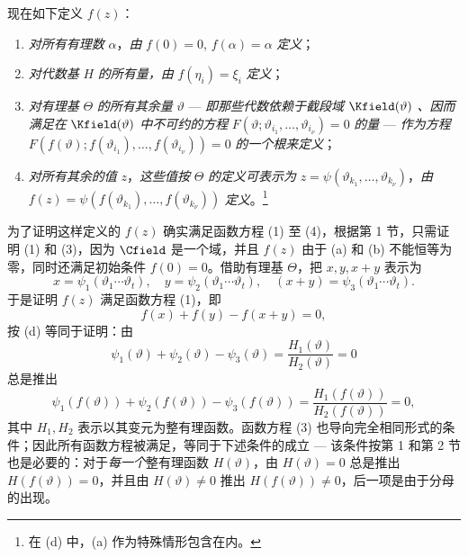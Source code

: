 现在如下定义 $f(z)$：
\begin{enumerate}
\item[(a)] \emph{对所有有理数} $\alpha$，\emph{由} $f(0)=0$, $f(\alpha)=\alpha$ \emph{定义}；
\item[(b)] \emph{对代数基} $H$ \emph{的所有量，由} $f(\eta_i)=\xi_i$ \emph{定义}；
\item[(c)] \emph{对有理基} $\Theta$ \emph{的所有其余量} $\vartheta$ --- \emph{即那些代数依赖于截段域} $\Kfield(\vartheta)$ \emph{、因而满足在} $\Kfield(\vartheta)$ \emph{中不可约的方程} $F(\vartheta;\vartheta_{i_1},\ldots,\vartheta_{i_\nu})=0$ \emph{的量} --- \emph{作为方程} $F(f(\vartheta);f(\vartheta_{i_1}),\ldots,f(\vartheta_{i_\nu}))=0$ \emph{的一个根来定义}；
\item[(d)] \emph{对所有其余的值} $z$，\emph{这些值按} $\Theta$ \emph{的定义可表示为} $z=\psi(\vartheta_{k_1},\ldots,\vartheta_{k_\nu})$，\emph{由} $f(z)=\psi(f(\vartheta_{k_1}),\ldots,f(\vartheta_{k_\nu}))$ \emph{定义}。\footnote{在 (d) 中，(a) 作为特殊情形包含在内。}
\end{enumerate}

为了证明这样定义的 $f(z)$ 确实满足函数方程 (1) 至 (4)，根据第 1 节，只需证明 (1) 和 (3)，因为 $\Cfield$ 是一个域，并且 $f(z)$ 由于 (a) 和 (b) 不能恒等为零，同时还满足初始条件 $f(0)=0$。借助有理基 $\Theta$，把 $x,y,x+y$ 表示为
\[
x=\psi_1(\vartheta_1\cdots\vartheta_t),\quad
 y=\psi_2(\vartheta_1\cdots\vartheta_t),\quad
 (x+y)=\psi_3(\vartheta_1\cdots\vartheta_t).
\]
于是证明 $f(z)$ 满足函数方程 (1)，即
\[
f(x)+f(y)-f(x+y)=0,
\]
按 (d) 等同于证明：由
\[
\psi_1(\vartheta)+\psi_2(\vartheta)-\psi_3(\vartheta)
 =\frac{H_1(\vartheta)}{H_2(\vartheta)}=0
\]
总是推出
\[
\psi_1(f(\vartheta))+\psi_2(f(\vartheta))-\psi_3(f(\vartheta))
 =\frac{H_1(f(\vartheta))}{H_2(f(\vartheta))}=0,
\]
其中 $H_1,H_2$ 表示以其变元为整有理函数。函数方程 (3) 也导向完全相同形式的条件；因此所有函数方程被满足，等同于下述条件的成立 --- 该条件按第 1 和第 2 节也是必要的：对于\emph{每一个}整有理函数 $H(\vartheta)$，由 $H(\vartheta)=0$ 总是推出 $H(f(\vartheta))=0$，并且由 $H(\vartheta)\ne0$ 推出 $H(f(\vartheta))\ne0$，后一项是由于分母的出现。

